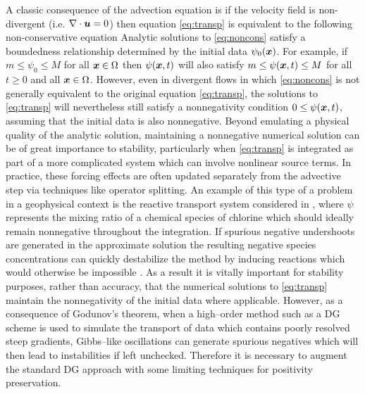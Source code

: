 \documentclass{ametsoc}
\begin{document}
A classic consequence of the advection equation is if the velocity field is non-divergent (i.e. $\nabla \cdot \boldsymbol{u} = 0$) then equation \eqref{eq:transp} is equivalent to the following non-conservative equation
Analytic solutions to \eqref{eq:noncons} satisfy a boundedness relationship determined by the initial data $\psi_0(\boldsymbol{x})$. For example, if $m \leq \psi_0 \leq M$ for all $\boldsymbol{x} \in \Omega$ then $\psi(\boldsymbol{x},t)$ will also satisfy $m \leq \psi(\boldsymbol{x},t) \leq M$ for all $t \geq 0$ and all $\boldsymbol{x} \in \Omega$.  However, even in divergent flows in which \eqref{eq:noncons} is not generally equivalent to the original equation \eqref{eq:transp}, the solutions to \eqref{eq:transp} will nevertheless still satisfy a nonnegativity condition $0 \leq \psi(\boldsymbol{x},t)$, assuming that the initial data is also nonnegative. Beyond emulating a physical quality of the analytic solution, maintaining a nonnegative numerical solution can be of great importance to stability, particularly when \eqref{eq:transp} is integrated as part of a more complicated system which can involve nonlinear source terms. In practice, these forcing effects are often updated separately from the advective step via techniques like operator splitting. An example of this type of a problem in a geophysical context is the reactive transport system considered in \citet{Lauritzen:2015aa}, where $\psi$ represents the mixing ratio of a chemical species of chlorine which should ideally remain nonnegative throughout the integration. If spurious negative undershoots are generated in the approximate solution the resulting negative species concentrations can quickly destabilize the method by inducing reactions which would otherwise be impossible \citep{durran2010numerical}. As a result it is vitally important for stability purposes, rather than accuracy, that the numerical solutions to \eqref{eq:transp} maintain the nonnegativity of the initial data where applicable. However, as a consequence of Godunov's theorem, when a high--order method such as a DG scheme is used to simulate the transport of data which contains poorly resolved steep gradients, Gibbs--like oscillations can generate spurious negatives which will then lead to instabilities if left unchecked. Therefore it is necessary to augment the standard DG approach with some limiting techniques for positivity preservation.
\end{document}
